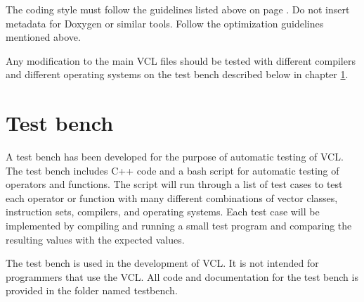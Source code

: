 \documentclass[vcl_manual.tex]{subfiles}
\begin{document}
The coding style must follow the guidelines listed above on page \pageref{CodingStyle}. Do not insert metadata for Doxygen or similar tools. Follow the optimization guidelines mentioned above.


Any modification to the main VCL files should be tested with different compilers and different operating systems on the test bench described below in chapter \ref{chap:TestBench}.



\section{Test bench}\label{chap:TestBench}
A test bench has been developed for the purpose of automatic testing of VCL.
The test bench includes C++ code and a bash script for automatic testing of operators and functions. The script will run through a list of test cases to test each operator or  function with many different combinations of vector classes, instruction sets, compilers, and operating systems. Each test case will be implemented by compiling and running a small test program and comparing the resulting values with the expected values.

The test bench is used in the development of VCL. It is not intended for programmers that use the VCL. All code and documentation for the test bench is provided in the folder named testbench.
\end{document}

